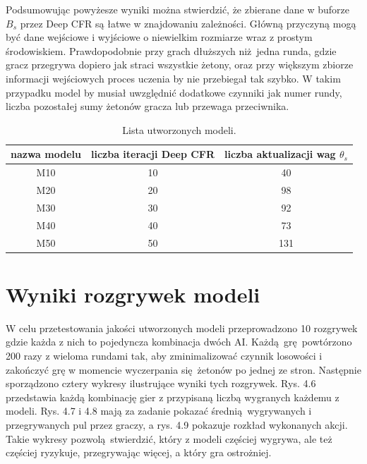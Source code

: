 \documentclass[12pt,oneside,a4paper]{report}
\begin{document}
Podsumowując powyżesze wyniki można stwierdzić, że zbierane dane w buforze $B_{s}$
przez Deep CFR są łatwe w znajdowaniu zależności. Główną przyczyną mogą być dane 
wejściowe i wyjściowe o niewielkim rozmiarze wraz z prostym środowiskiem.
Prawdopodobnie przy grach dłuższych niż jedna runda, gdzie gracz przegrywa dopiero jak straci 
wszystkie żetony, oraz przy większym zbiorze informacji wejściowych proces uczenia by nie 
przebiegał tak szybko. W takim przypadku model by musiał uwzględnić dodatkowe czynniki jak 
numer rundy, liczba pozostałej sumy żetonów gracza lub przewaga przeciwnika. 


\vspace{1cm}
\begin{table}[th!]
\centering
\caption{Lista utworzonych modeli.}
\begin{tabular}{|c|c|c| }
   \hline
   nazwa modelu & liczba iteracji Deep CFR & liczba aktualizacji wag $\theta_{s}$ \\
    \hline
   M10 & 10 & 40 \\ 
   \hline
   M20 & 20 & 98  \\  
   \hline
   M30 & 30 & 92 \\
   \hline
   M40 & 40 & 73 \\
   \hline
   M50 & 50 & 131 \\
   \hline
\end{tabular}
\end{table}


\section{Wyniki rozgrywek modeli}


W celu przetestowania jakości utworzonych modeli przeprowadzono 10 
rozgrywek gdzie każda z nich to
pojedyncza kombinacja dwóch AI. Każdą grę powtórzono 200 razy z wieloma rundami tak, aby
zminimalizować czynnik losowości i zakończyć grę w momencie wyczerpania się żetonów po jednej ze
stron.
Następnie sporządzono cztery wykresy
ilustrujące wyniki tych rozgrywek. Rys. 4.6 przedstawia każdą kombinację gier 
z przypisaną liczbą 
wygranych każdemu z modeli. Rys. 4.7 i 4.8 mają za zadanie pokazać średnią wygrywanych i przegrywanych
pul przez graczy, a rys. 4.9 pokazuje rozkład wykonanych akcji. Takie wykresy pozwolą stwierdzić, który z modeli częściej wygrywa, ale też częściej
ryzykuje, przegrywając więcej, a który gra ostrożniej. 
 
\end{document}
